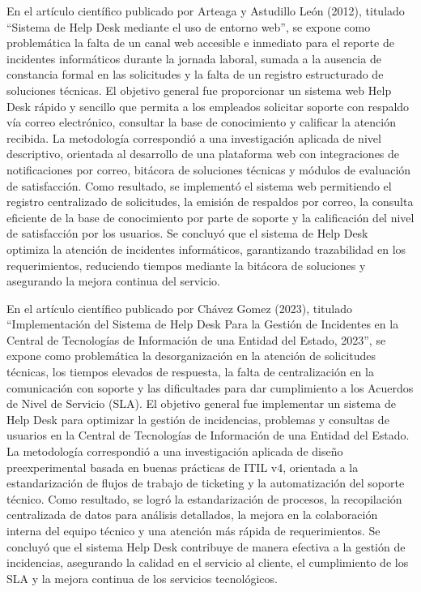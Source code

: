 \vspace{0.8em}

En el artículo científico publicado por Arteaga y Astudillo León (2012), titulado ``Sistema de Help Desk mediante el uso de entorno web'', se expone como problemática la falta de un canal web accesible e inmediato para el reporte de incidentes informáticos durante la jornada laboral, sumada a la ausencia de constancia formal en las solicitudes y la falta de un registro estructurado de soluciones técnicas. El objetivo general fue proporcionar un sistema web Help Desk rápido y sencillo que permita a los empleados solicitar soporte con respaldo vía correo electrónico, consultar la base de conocimiento y calificar la atención recibida. La metodología correspondió a una investigación aplicada de nivel descriptivo, orientada al desarrollo de una plataforma web con integraciones de notificaciones por correo, bitácora de soluciones técnicas y módulos de evaluación de satisfacción. Como resultado, se implementó el sistema web permitiendo el registro centralizado de solicitudes, la emisión de respaldos por correo, la consulta eficiente de la base de conocimiento por parte de soporte y la calificación del nivel de satisfacción por los usuarios. Se concluyó que el sistema de Help Desk optimiza la atención de incidentes informáticos, garantizando trazabilidad en los requerimientos, reduciendo tiempos mediante la bitácora de soluciones y asegurando la mejora continua del servicio.

\vspace{0.8em}

En el artículo científico publicado por Chávez Gomez (2023), titulado ``Implementación del Sistema de Help Desk Para la Gestión de Incidentes en la Central de Tecnologías de Información de una Entidad del Estado, 2023'', se expone como problemática la desorganización en la atención de solicitudes técnicas, los tiempos elevados de respuesta, la falta de centralización en la comunicación con soporte y las dificultades para dar cumplimiento a los Acuerdos de Nivel de Servicio (SLA). El objetivo general fue implementar un sistema de Help Desk para optimizar la gestión de incidencias, problemas y consultas de usuarios en la Central de Tecnologías de Información de una Entidad del Estado. La metodología correspondió a una investigación aplicada de diseño preexperimental basada en buenas prácticas de ITIL v4, orientada a la estandarización de flujos de trabajo de ticketing y la automatización del soporte técnico. Como resultado, se logró la estandarización de procesos, la recopilación centralizada de datos para análisis detallados, la mejora en la colaboración interna del equipo técnico y una atención más rápida de requerimientos. Se concluyó que el sistema Help Desk contribuye de manera efectiva a la gestión de incidencias, asegurando la calidad en el servicio al cliente, el cumplimiento de los SLA y la mejora continua de los servicios tecnológicos.

